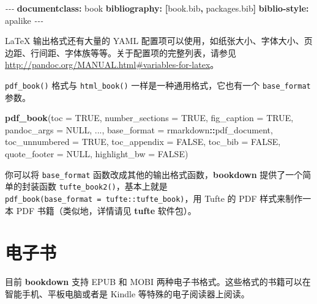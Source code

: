 \documentclass[
  12pt,
]{krantz}
\newenvironment{Shaded}{\begin{snugshade}}{\end{snugshade}}
\newcommand{\AttributeTok}[1]{\textcolor[rgb]{0.13,0.29,0.53}{#1}}
\newcommand{\ConstantTok}[1]{\textcolor[rgb]{0.56,0.35,0.01}{#1}}
\newcommand{\FunctionTok}[1]{\textcolor[rgb]{0.13,0.29,0.53}{\textbf{#1}}}
\newcommand{\KeywordTok}[1]{\textcolor[rgb]{0.13,0.29,0.53}{\textbf{#1}}}
\newcommand{\NormalTok}[1]{#1}
\newcommand{\PreprocessorTok}[1]{\textcolor[rgb]{0.56,0.35,0.01}{\textit{#1}}}
\newcommand{\SpecialCharTok}[1]{\textcolor[rgb]{0.81,0.36,0.00}{\textbf{#1}}}
\theoremstyle{definition}
\theoremstyle{definition}
\theoremstyle{definition}
\theoremstyle{definition}
\theoremstyle{remark}
\begin{document}
\begin{Shaded}
\begin{Highlighting}[]
\PreprocessorTok{{-}{-}{-}}
\FunctionTok{documentclass}\KeywordTok{:}\AttributeTok{ book}
\FunctionTok{bibliography}\KeywordTok{:}\AttributeTok{ }\KeywordTok{[}\AttributeTok{book.bib}\KeywordTok{,}\AttributeTok{ packages.bib}\KeywordTok{]}
\FunctionTok{biblio{-}style}\KeywordTok{:}\AttributeTok{ apalike}
\PreprocessorTok{{-}{-}{-}}
\end{Highlighting}
\end{Shaded}

LaTeX 输出格式还有大量的 YAML 配置项可以使用，如纸张大小、字体大小、页边距、行间距、字体族等等。关于配置项的完整列表，请参见 \url{http://pandoc.org/MANUAL.html\#variables-for-latex}。

\texttt{pdf\_book()} 格式与 \texttt{html\_book()} 一样是一种通用格式，它也有一个 \texttt{base\_format} 参数。

\begin{Shaded}
\begin{Highlighting}[]
\FunctionTok{pdf\_book}\NormalTok{(}\AttributeTok{toc =} \ConstantTok{TRUE}\NormalTok{, }\AttributeTok{number\_sections =} \ConstantTok{TRUE}\NormalTok{,}
  \AttributeTok{fig\_caption =} \ConstantTok{TRUE}\NormalTok{, }\AttributeTok{pandoc\_args =} \ConstantTok{NULL}\NormalTok{, ...,}
  \AttributeTok{base\_format =}\NormalTok{ rmarkdown}\SpecialCharTok{::}\NormalTok{pdf\_document,}
  \AttributeTok{toc\_unnumbered =} \ConstantTok{TRUE}\NormalTok{, }\AttributeTok{toc\_appendix =} \ConstantTok{FALSE}\NormalTok{,}
  \AttributeTok{toc\_bib =} \ConstantTok{FALSE}\NormalTok{, }\AttributeTok{quote\_footer =} \ConstantTok{NULL}\NormalTok{,}
  \AttributeTok{highlight\_bw =} \ConstantTok{FALSE}\NormalTok{)}
\end{Highlighting}
\end{Shaded}

你可以将 \texttt{base\_format} 函数改成其他的输出格式函数，\textbf{bookdown} 提供了一个简单的封装函数 \texttt{tufte\_book2()}，基本上就是 \texttt{pdf\_book(base\_format\ =\ tufte::tufte\_book)}，用 Tufte 的 PDF 样式来制作一本 PDF 书籍（类似地，详情请见 \textbf{tufte} 软件包）。

\section{电子书}\label{ux7535ux5b50ux4e66}

目前 \textbf{bookdown} 支持 EPUB 和 MOBI 两种电子书格式。这些格式的书籍可以在智能手机、平板电脑或者是 Kindle 等特殊的电子阅读器上阅读。
\end{document}
